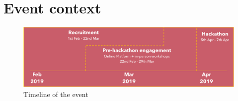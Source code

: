 
\section{Event context}
\label{sec:DemVRContextEvent}

\begin{figure}[htp]
\centering
\includegraphics[width=.8\linewidth]{Images/DemVR/Timeline.jpg}
\caption{Timeline of the event}
\label{fig:DemVRTimeline}
\end{figure}

